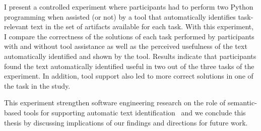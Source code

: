 I present a controlled experiment where participants had to 
perform two Python programming when assisted (or not) by a tool that automatically identifies task-relevant text 
in the set of artifacts available for each task. 
With this experiment, I compare the correctness of the solutions of each task 
performed by participants with and without tool assistance
as well as the perceived usefulness of the text automatically identified and shown by the tool. 
Results indicate that participants found the text automatically identified
useful in two out of the three tasks of the experiment.
In addition, tool support also led to more correct solutions 
in one of the task in the study.





This experiment strengthen software engineering research on the 
role of semantic-based tools for supporting
automatic text identification~\cite{nadi2020, Xu2017,Lotufo2012}
and we conclude this thesis by discussing implications of our findings and 
directions for future work.




